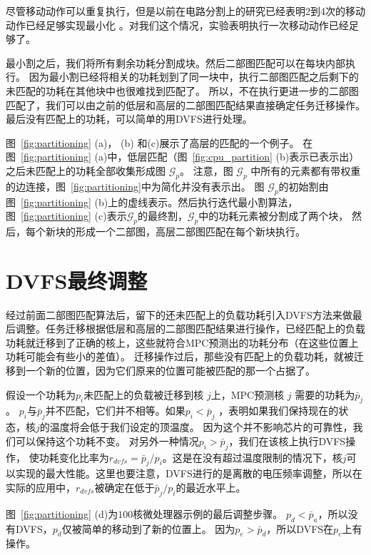 尽管移动动作可以重复执行，但是以前在电路分割上的研究已经表明2到4次的移动动作已经足够实现最小化 \cite{Fidducia:DAC'82,Dutt:DAC'96} 。对我们这个情况，实验表明执行一次移动动作已经足够了。

最小割之后，我们将所有剩余功耗分割成块。然后二部图匹配可以在每块内部执行。
因为最小割已经将相关的功耗划到了同一块中，执行二部图匹配之后剩下的未匹配的功耗在其他块中也很难找到匹配了。
所以，不在执行更进一步的二部图匹配了，我们可以由之前的低层和高层的二部图匹配结果直接确定任务迁移操作。
最后没有匹配上的功耗，可以简单的用DVFS进行处理。

图~\ref{fig:partitioning} (a)， (b) 和(c)展示了高层的匹配的一个例子。
在图~\ref{fig:partitioning} (a)中，低层匹配（图~\ref{fig:cpu_partition} (b)表示已表示出）之后未匹配上的功耗全部收集形成图 $\mathcal{G}_p$。
注意，图 $\mathcal{G}_p$ 中所有的元素都有带权重的边连接，图~\ref{fig:partitioning}中为简化并没有表示出。
图 $\mathcal{G}_p$的初始割由图~\ref{fig:partitioning} (b)上的虚线表示。然后执行迭代最小割算法，
图~\ref{fig:partitioning} (c)表示$\mathcal{G}_p$的最终割，$\mathcal{G}_p$中的功耗元素被分割成了两个块，
然后，每个新块的形成一个二部图，高层二部图匹配在每个新块执行。


\section{DVFS最终调整}\label{sec:dvfs_adj}

经过前面二部图匹配算法后，留下的还未匹配上的负载功耗引入DVFS方法来做最后调整。任务迁移根据低层和高层的二部图匹配结果进行操作，已经匹配上的负载功耗就迁移到了正确的核上，这些就符合MPC预测出的功耗分布（在这些位置上功耗可能会有些小的差值）。
迁移操作过后，那些没有匹配上的负载功耗，就被迁移到一个新的位置，因为它们原来的位置可能被匹配的那一个占据了。

假设一个功耗为$p_i$未匹配上的负载被迁移到核 $j$上，MPC预测核 $j$ 需要的功耗为$\bar{p}_j$。
$p_i$与$\bar{p}_j$并不匹配，它们并不相等。如果$p_i < \bar{p}_j$ ，表明如果我们保持现在的状态，核$j$的温度将会低于我们设定的顶温度。
因为这个并不影响芯片的可靠性，我们可以保持这个功耗不变。
对另外一种情况$p_i > \bar{p}_j$，我们在该核上执行DVFS操作，
使功耗变化比率为$r_{dvfs} = \bar{p}_j/p_i$。这是在没有超过温度限制的情况下，核$j$可以实现的最大性能。这里也要注意，DVFS进行的是离散的电压频率调整，所以在实际的应用中，$r_{dvfs}$被确定在低于$\bar{p}_j/p_i$的最近水平上。

图~\ref{fig:partitioning} (d)为$100$核微处理器示例的最后调整步骤。
$p_d < \bar{p}_a$，所以没有DVFS，$p_d$仅被简单的移动到了新的位置上。
因为$p_e>\bar{p}_d$，所以DVFS在$p_e$上有操作。

